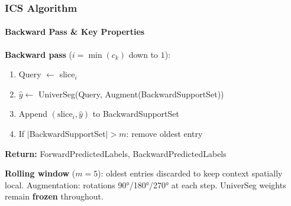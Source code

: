 \documentclass[nometaot,lecture,amberg,toc=twocolumn,indicatelastpageofframe,footlinebox]{OTHAWbeamer}
\begin{document}
\begin{frame}
    \frametitle{ICS Algorithm }
    \framesubtitle{Backward Pass \& Key Properties}

    {\small
    \textcolor{lila1}{\textbf{Backward pass}} ($i = \min(c_k)$ down to $1$):
    \begin{enumerate}\itemsep6pt
        \item Query $\leftarrow$ slice$_i$
        \item $\hat{y} \leftarrow$ UniverSeg(Query, Augment(BackwardSupportSet))
        \item Append $(\text{slice}_i, \hat{y})$ to BackwardSupportSet
        \item If $|$BackwardSupportSet$| > m$: remove oldest entry
    \end{enumerate}

    \vspace{0.5em}
    \textbf{Return:} ForwardPredictedLabels, BackwardPredictedLabels

    \vspace{0.6em}
    \textcolor{orange1}{\textbf{Rolling window}} ($m = 5$): oldest entries discarded to keep context spatially local.
    Augmentation: rotations 90°/180°/270° at each step.
    UniverSeg weights remain \textbf{frozen} throughout.
    }

\end{frame}

\end{document}
